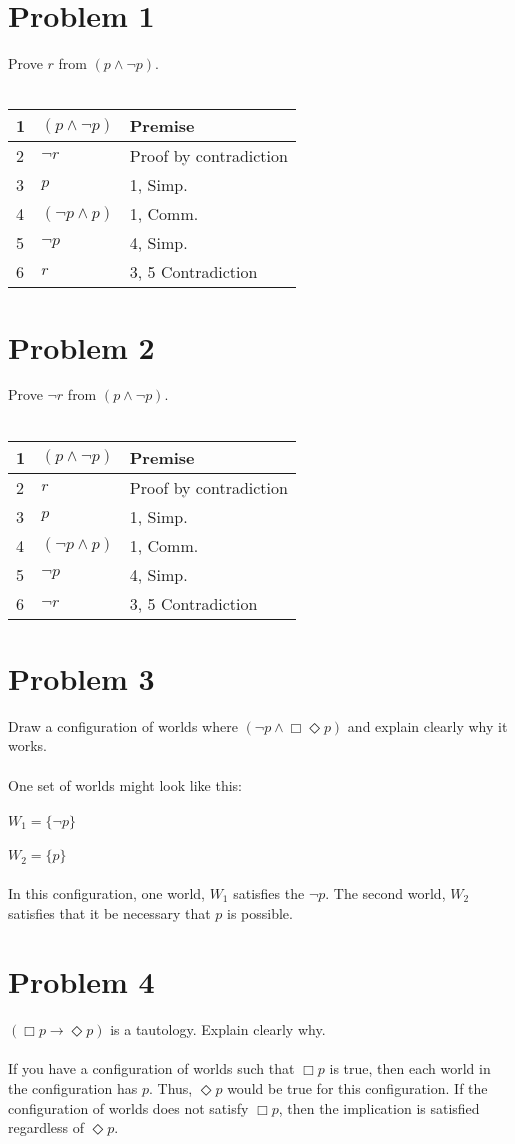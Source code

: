 \documentclass{article}%
\begin{document}
\section*{Problem 1}
Prove $r$ from $(p \wedge \neg p)$.\\
\\
\begin{tabular}{l l | l}
    1 & $(p \wedge \neg p)$ & Premise \\ \hline
    2 & $\neg r$ & Proof by contradiction \\ \hline
    3 & $p$ & 1, Simp. \\ \hline
    4 & $(\neg p \wedge p)$ & 1, Comm. \\ \hline
    5 & $\neg p$ & 4, Simp. \\ \hline
    6 & $r$ & 3, 5 Contradiction
\end{tabular}

\section*{Problem 2}
Prove $\neg r$ from $(p \wedge \neg p)$.\\
\\
\begin{tabular}{l l | l}
    1 & $(p \wedge \neg p)$ & Premise \\ \hline
    2 & $r$ & Proof by contradiction \\ \hline
    3 & $p$ & 1, Simp. \\ \hline
    4 & $(\neg p \wedge p)$ & 1, Comm. \\ \hline
    5 & $\neg p$ & 4, Simp. \\ \hline
    6 & $\neg r$ & 3, 5 Contradiction
\end{tabular}

\section*{Problem 3}
Draw a configuration of worlds where $(\neg p \wedge \Box \Diamond p)$ and explain clearly why it works.\\
\\
One set of worlds might look like this:\\
\\
$W_1 = \{\neg p\}$\\
\\
$W_2 = \{p\}$\\
\\
In this configuration, one world, $W_1$ satisfies the $\neg p$. The second world, $W_2$ satisfies that it be necessary
that $p$ is possible.

\section*{Problem 4}
$(\Box p \rightarrow \Diamond p)$ is a tautology. Explain clearly why.\\
\\
If you have a configuration of worlds such that $\Box p$ is true, then each world in the configuration has $p$. Thus,
$\Diamond p$ would be true for this configuration. If the configuration of worlds does not satisfy $\Box p$, then the
implication is satisfied regardless of $\Diamond p$.
\end{document}
